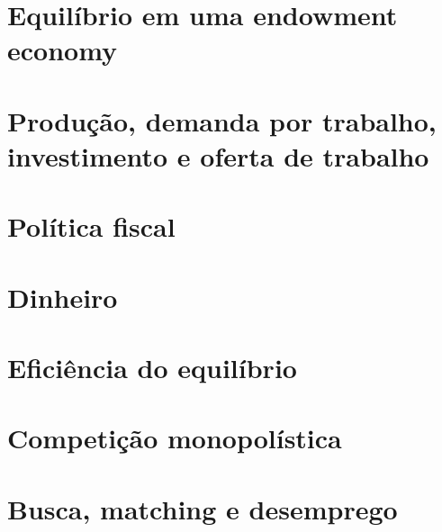\documentclass[a4paper,11pt]{book}
\theoremstyle{definition}
\begin{document}
\chapter{Equilíbrio em uma endowment economy}

\chapter{Produção, demanda por trabalho, investimento e oferta de trabalho}

\chapter{Política fiscal}

\chapter{Dinheiro}

\chapter{Eficiência do equilíbrio}

\chapter{Competição monopolística}

\chapter{Busca, matching e desemprego}
\end{document}
